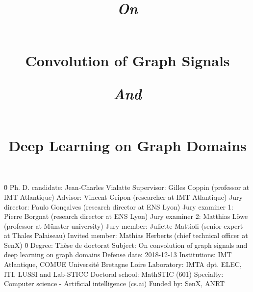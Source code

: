 \documentclass[12pt]{book}
\begin{document}

%
%

%

%
%

\pagestyle{empty}
\newline
\newline
\h{0}\newline
Ph. D. candidate: Jean-Charles Vialatte\newline
Supervisor: Gilles Coppin (professor at IMT Atlantique)\newline
Advisor: Vincent Gripon (researcher at IMT Atlantique)\newline
Jury director: Paulo Gonçalves (research director at ENS Lyon)\newline
Jury examiner 1: Pierre Borgnat (research director at ENS Lyon)\newline
Jury examiner 2: Matthias Löwe (professor at Münster university)\newline
Jury member: Juliette Mattioli (senior expert at Thales Palaiseau)\newline
Invited member: Mathias Herberts (chief technical officer at SenX)\newline
\h{0}\newline
Degree: Thèse de doctorat\newline
Subject: On convolution of graph signals and deep learning on graph domains\newline
Defense date: 2018-12-13\newline
Institutions: IMT Atlantique, COMUE Université Bretagne Loire\newline
Laboratory: IMTA dpt. ELEC, ITI, LUSSI and Lab-STICC\newline
Doctoral school: MathSTIC (601)\newline
Specialty: Computer science - Artificial intelligence (cs.ai)\newline
Funded by: SenX, ANRT


%

%
%

\title{\begin{large}\emph{On}\end{large}\\Convolution of Graph Signals\\\begin{large}\emph{And}\end{large}\\Deep Learning on Graph Domains}
\date{}
\maketitle
\end{document}
